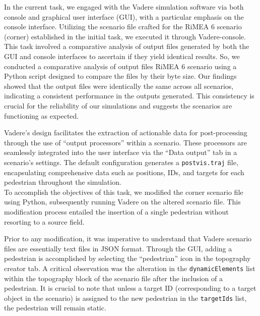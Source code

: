

In the current task, we engaged with the Vadere\cite{vadere} simulation software via both console and graphical user interface (GUI), with a particular emphasis on the console interface. Utilizing the scenario file crafted for the RiMEA 6 scenario (corner) established in the initial task, we executed it through Vadere-console. This task involved a comparative analysis of output files generated by both the GUI and console interfaces to ascertain if they yield identical results. So, we conducted a comparative analysis of output files RiMEA 6 scenario using a Python script designed to compare the files by their byte size. Our findings showed that the output files were identically the same across all scenarios, indicating a consistent performance in the outputs generated. This consistency is crucial for the reliability of our simulations and suggests the scenarios are functioning as expected. 

Vadere's design facilitates the extraction of actionable data for post-processing through the use of “output processors” within a scenario. These processors are seamlessly integrated into the user interface via the “Data output” tab in a scenario’s settings. The default configuration generates a \texttt{postvis.traj} file, encapsulating comprehensive data such as positions, IDs, and targets for each pedestrian throughout the simulation. \\

To accomplish the objectives of this task, we modified the corner scenario file using Python, subsequently running Vadere on the altered scenario file. This modification process entailed the insertion of a single pedestrian without resorting to a source field.

Prior to any modification, it was imperative to understand that Vadere scenario files are essentially text files in JSON format. Through the GUI, adding a pedestrian is accomplished by selecting the “pedestrian” icon in the topography creator tab. A critical observation was the alteration in the \texttt{dynamicElements} list within the topography block of the scenario file after the inclusion of a pedestrian. It is crucial to note that unless a target ID (corresponding to a target object in the scenario) is assigned to the new pedestrian in the \texttt{targetIds} list, the pedestrian will remain static.\\ 


